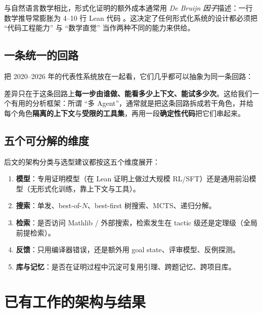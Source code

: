 \documentclass[UTF8,a4paper,11pt,fontset=windows]{ctexart}
\begin{document}
与自然语言数学相比，形式化证明的额外成本通常用 \emph{De Bruijn 因子}描述：一行数学推导常膨胀为 4--10 行 Lean 代码 \cite{seedprover}。这决定了任何形式化系统的设计都必须把 ``代码工程能力'' 与 ``数学直觉'' 当作两种不同的能力来供给。

\subsection{一条统一的回路}

把 2020--2026 年的代表性系统放在一起看，它们几乎都可以抽象为同一条回路：

\begin{center}
\end{center}

差异只在于这条回路上\textbf{每一步由谁做、能看多少上下文、能试多少次}。这给我们一个有用的分析框架：所谓 ``多 Agent''，通常就是把这条回路拆成若干角色，并给每个角色\textbf{隔离的上下文}与\textbf{受限的工具集}，再用一段\textbf{确定性代码}把它们串起来。

\subsection{五个可分解的维度}

后文的架构分类与选型建议都按这五个维度展开：

\begin{enumerate}
  \item \textbf{模型}：专用证明模型（在 Lean 证明上做过大规模 RL/SFT）还是通用前沿模型（无形式化训练，靠上下文与工具）。
  \item \textbf{搜索}：单发、best-of-$N$、best-first 树搜索、MCTS、递归分解。
  \item \textbf{检索}：是否访问 Mathlib / 外部搜索，检索发生在 tactic 级还是定理级（全局前提检索）。
  \item \textbf{反馈}：只用编译器错误，还是额外用 goal state、评审模型、反例探测。
  \item \textbf{库与记忆}：是否在证明过程中沉淀可复用引理、跨题记忆、跨项目库。
\end{enumerate}

\section{已有工作的架构与结果}
\end{document}
